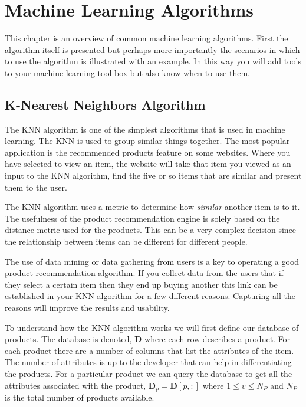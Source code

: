 \chapter{Machine Learning Algorithms}
	
This chapter is an overview of common machine learning algorithms. First the algorithm itself is presented but perhaps more importantly the scenarios in which to use the algorithm is illustrated with an example. In this way you will add tools to your machine learning tool box but also know when to use them. 

\section{K-Nearest Neighbors Algorithm}
	
The \ac{KNN} algorithm is one of the simplest algorithms that is used in machine learning. The \ac{KNN} is used to group similar things together. The most popular application is the recommended products feature on some websites. Where you have selected to view an item, the website will take that item you viewed as an input to the \ac{KNN} algorithm, find the five or so items that are similar and present them to the user.

The \ac{KNN} algorithm uses a metric to determine how \emph{similar} another item is to it. The usefulness of the product recommendation engine is solely based on the distance metric used for the products. This can be a very complex decision since the relationship between items can be different for different people. 

The use of data mining or data gathering from users is a key to operating a good product recommendation algorithm. If you collect data from the users that if they select a certain item then they end up buying another this link can be established in your \ac{KNN} algorithm for a few different reasons. Capturing all the reasons will improve the results and usability.

To understand how the \ac{KNN} algorithm works we will first define our database of products. The database is denoted, $\mathbf{D}$ where each row describes a product. For each product there are a number of columns that list the attributes of the item. The number of attributes is up to the developer that can help in differentiating the products. For a particular product we can query the database to get all the attributes associated with the product, $\mathbf{D}_p = \mathbf{D}[p,:]$ where $1 \leq v \leq N_P$ and $N_P$ is the total number of products available.  

